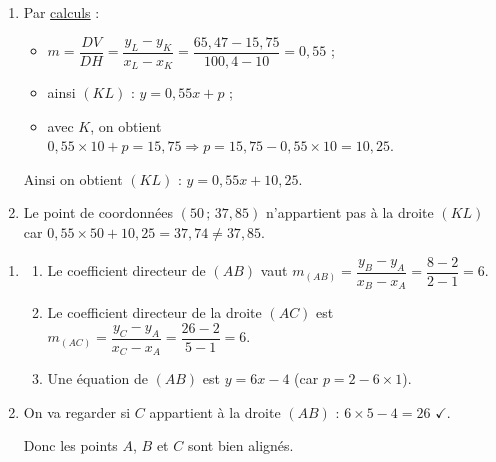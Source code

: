 \documentclass[a4paper,11pt]{article}
\begin{document}
\begin{enumerate}
	\item Par \uline{calculs} :
	\begin{itemize}
		\item $m=\dfrac{DV}{DH}=\dfrac{y_L-y_K}{x_L-x_K}=\dfrac{65,47-15,75}{100,4-10}=0,55$ ;
		\item ainsi $(KL)$ : $y=0,55x+p$ ;
		\item avec $K$, on obtient $0,55 \times 10 + p = 15,75 \Rightarrow p = 15,75 - 0,55 \times 10 = 10,25$.
	\end{itemize}
	Ainsi on obtient $(KL)$ : $y=0,55x+10,25$.
	\item Le point de coordonnées $(50\,;\,37,85)$ n'appartient pas à la droite $(KL)$ car $0,55 \times 50 + 10,25 = 37,74 \neq 37,85$.
\end{enumerate}

\medskip


\begin{enumerate}
	\item
	\begin{enumerate}
		\item Le coefficient directeur de $(AB)$ vaut $m_{(AB)}=\dfrac{y_B-y_A}{x_B-x_A}=\dfrac{8-2}{2-1}=6$.
		\item Le coefficient directeur de la droite $(AC)$ est $m_{(AC)}=\dfrac{y_C-y_A}{x_C-x_A}=\dfrac{26-2}{5-1}=6$.
		\item Une équation de $(AB)$ est $y=6x-4$ (car $p=2-6\times1$).
	\end{enumerate}
	\item On va regarder si $C$ appartient à la droite $(AB)$ : $6 \times 5 - 4 = 26$ $\checkmark$.
	
	Donc les points $A$, $B$ et $C$ sont bien alignés.
\end{enumerate}

\medskip

\end{document}
